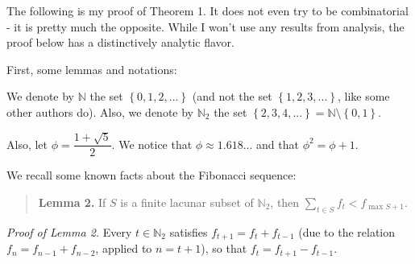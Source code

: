 \documentclass[12pt,final,notitlepage,onecolumn]{article}%
\begin{document}
The following is my proof of Theorem 1. It does not even try to be
combinatorial - it is pretty much the opposite. While I won't use any results
from analysis, the proof below has a distinctively analytic flavor.

First, some lemmas and notations:

We denote by $\mathbb{N}$ the set $\left\{  0,1,2,...\right\}  $ (and not the
set $\left\{  1,2,3,...\right\}  $, like some other authors do). Also, we
denote by $\mathbb{N}_{2}$ the set $\left\{  2,3,4,...\right\}  =\mathbb{N}%
\setminus\left\{  0,1\right\}  $.

Also, let $\phi=\dfrac{1+\sqrt{5}}{2}$. We notice that $\phi\approx1.618...$
and that $\phi^{2}=\phi+1$.

We recall some known facts about the Fibonacci sequence:

\begin{quote}
\textbf{Lemma 2.} If $S$ is a finite lacunar subset of $\mathbb{N}_{2}$, then
$\sum\limits_{t\in S}f_{t}<f_{\max S+1}$.
\end{quote}

\textit{Proof of Lemma 2.} Every $t\in\mathbb{N}_{2}$ satisfies $f_{t+1}%
=f_{t}+f_{t-1}$ (due to the relation $f_{n}=f_{n-1}+f_{n-2}$, applied to
$n=t+1$), so that $f_{t}=f_{t+1}-f_{t-1}$.
\end{document}
